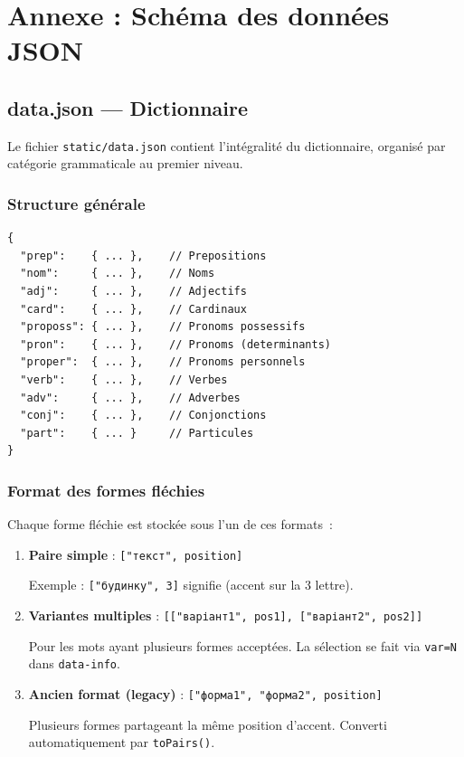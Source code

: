 \section{Annexe : Schéma des données JSON}
\label{sec:data-schema}

\subsection{data.json --- Dictionnaire}

Le fichier \texttt{static/data.json} contient l'intégralité du dictionnaire, organisé par catégorie grammaticale au premier niveau.

\subsubsection{Structure générale}

\begin{lstlisting}[title=Structure de premier niveau]
{
  "prep":    { ... },    // Prepositions
  "nom":     { ... },    // Noms
  "adj":     { ... },    // Adjectifs
  "card":    { ... },    // Cardinaux
  "proposs": { ... },    // Pronoms possessifs
  "pron":    { ... },    // Pronoms (determinants)
  "proper":  { ... },    // Pronoms personnels
  "verb":    { ... },    // Verbes
  "adv":     { ... },    // Adverbes
  "conj":    { ... },    // Conjonctions
  "part":    { ... }     // Particules
}
\end{lstlisting}

\subsubsection{Format des formes fléchies}

Chaque forme fléchie est stockée sous l'un de ces formats~:

\begin{enumerate}
  \item \textbf{Paire simple} : \texttt{["текст", position]}

  Exemple : \texttt{["будинку", 3]} signifie  (accent sur la 3\ieme{} lettre).

  \item \textbf{Variantes multiples} : \texttt{[["варіант1", pos1], ["варіант2", pos2]]}

  Pour les mots ayant plusieurs formes acceptées. La sélection se fait via \texttt{var=N} dans \texttt{data-info}.

  \item \textbf{Ancien format (legacy)} : \texttt{["форма1", "форма2", position]}

  Plusieurs formes partageant la même position d'accent. Converti automatiquement par \texttt{toPairs()}.
\end{enumerate}

